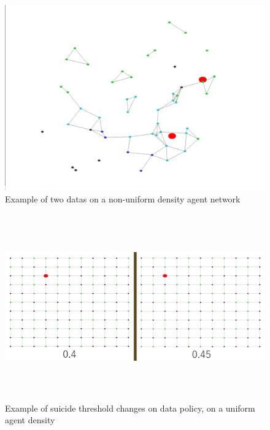\documentclass{UoYCSproject}
\begin{document}
\begin{figure}[htb]
\label{fig:Data7}
\begin{center}
\centering
\includegraphics[width=\linewidth, height=8cm]{"./MiscImgs/Replication_No_Suicide_threshold_0.8_c2_Non_uniform.png"}
\caption{Example of two datas on a non-uniform density agent network}
\end{center}
\end{figure}

\begin{figure}[htb]
\label{fig:Data8}
\begin{center}
\centering
\includegraphics[width=\linewidth, height=8cm]{"./MiscImgs/Rep_Sui_0.8_0.4-0.45_uniform_no_mo.png"}
\caption{Example of suicide threshold changes on data policy, on a uniform agent density}
\end{center}
\end{figure}
\end{document}
